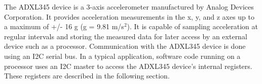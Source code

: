 \documentclass[11pt, twoside, pdftex]{article}
\begin{document}
The ADXL345 device is a 3-axis accelerometer manufactured by Analog Devices Corporation. It provides acceleration measurements in the x, y, and z axes up to a maximum of +/- 16 g (g = 9.81 m/s$^2$). It is capable of sampling acceleration at regular intervals and storing the measured data for later access by an external device such as a processor. Communication with the ADXL345 device is done using an I2C serial bus. In a typical application, software code running on a processor uses an I2C master to access the ADXL345 device's internal registers. These registers are described in the following section. %





\end{document}

